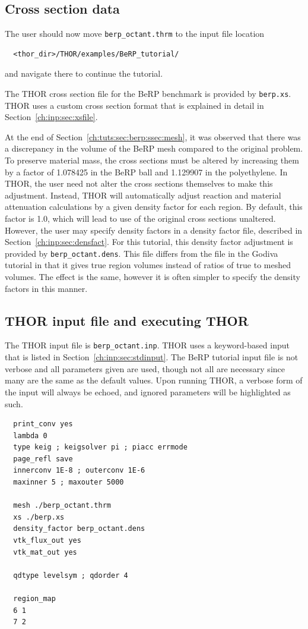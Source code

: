 \subsection{Cross section data}

The user should now move \verb"berp_octant.thrm" to the input file location
\begin{verbatim}
  <thor_dir>/THOR/examples/BeRP_tutorial/
\end{verbatim}
and navigate there to continue the tutorial.

The \ac{THOR} cross section file for the BeRP benchmark is provided by \verb"berp.xs".
\ac{THOR} uses a custom cross section format that is explained in detail in Section~\ref{ch:inp:sec:xsfile}.

At the end of Section~\ref{ch:tuts:sec:berp:ssec:mesh}, it was observed that there was a discrepancy in the volume of the BeRP mesh compared to the original problem.
To preserve material mass, the cross sections must be altered by increasing them by a factor of 1.078425 in the BeRP ball and 1.129907 in the polyethylene.
In \ac{THOR}, the user need not alter the cross sections themselves to make this adjustment.
Instead, \ac{THOR} will automatically adjust reaction and material attenuation calculations by a given density factor for each region.
By default, this factor is 1.0, which will lead to use of the original cross sections unaltered.
However, the user may specify density factors in a density factor file, described in Section~\ref{ch:inp:sec:densfact}.
For this tutorial, this density factor adjustment is provided by \verb"berp_octant.dens".
This file differs from the file in the Godiva tutorial in that it gives true region volumes instead of ratios of true to meshed volumes.
The effect is the same, however it is often simpler to specify the density factors in this manner.

\subsection{THOR input file and executing THOR}

The \ac{THOR} input file is \verb"berp_octant.inp".
\ac{THOR} uses a keyword-based input that is listed in Section~\ref{ch:inp:sec:stdinput}.
The BeRP tutorial input file is not verbose and all parameters given are used, though not all are necessary since many are the same as the default values.
Upon running \ac{THOR}, a verbose form of the input will always be echoed, and ignored parameters will be highlighted as such.
\begin{verbatim}
  print_conv yes
  lambda 0
  type keig ; keigsolver pi ; piacc errmode
  page_refl save
  innerconv 1E-8 ; outerconv 1E-6
  maxinner 5 ; maxouter 5000

  mesh ./berp_octant.thrm
  xs ./berp.xs
  density_factor berp_octant.dens
  vtk_flux_out yes
  vtk_mat_out yes

  qdtype levelsym ; qdorder 4

  region_map
  6 1
  7 2
\end{verbatim}

